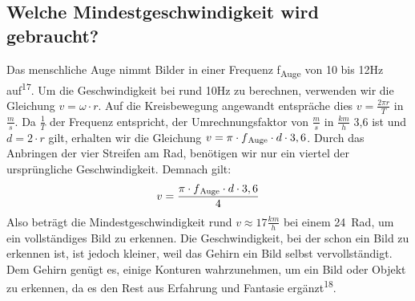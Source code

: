 \documentclass [a4paper, 11pt] {article}
\begin{document}
\subsection{Welche Mindestgeschwindigkeit wird gebraucht?}
Das menschliche Auge nimmt Bilder in einer Frequenz f\textsubscript{Auge} von 10 bis 12Hz auf\textsuperscript{17}. Um die Geschwindigkeit bei rund 10Hz zu berechnen, verwenden wir die Gleichung $v = \omega \cdot r$. Auf die Kreisbewegung angewandt entspräche dies $v = \frac{2\pi r}{T}$ in $\frac{m}{s}$. Da $\frac{1}{T}$ der Frequenz entspricht, der Umrechnungsfaktor von $\frac{m}{s}$ in $\frac{km}{h}$ 3,6 ist und $d = 2 \cdot r$ gilt, erhalten wir die Gleichung $v = \pi \cdot f\textsubscript{Auge} \cdot d \cdot 3,6$. Durch das Anbringen der vier Streifen am Rad, benötigen wir nur ein viertel der ursprüngliche Geschwindigkeit. Demnach gilt: 
\begin{align}
v = \frac{\pi \cdot f\textsubscript{Auge} \cdot d \cdot 3,6}{4}
\end{align}
Also beträgt die Mindestgeschwindigkeit rund $v \approx 17\frac{km}{h}$ bei einem 24\grqq\ Rad, um ein vollständiges Bild zu erkennen. Die Geschwindigkeit, bei der schon ein Bild zu erkennen ist, ist jedoch kleiner, weil das Gehirn ein Bild selbst vervollständigt. Dem Gehirn genügt es, einige Konturen wahrzunehmen, um ein Bild oder Objekt zu erkennen, da es den Rest aus Erfahrung und Fantasie ergänzt\textsuperscript{18}.
\end{document}
